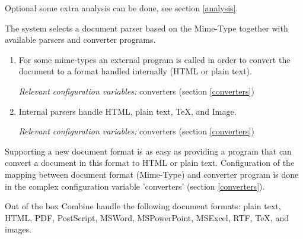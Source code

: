 Optional some extra analysis can be done, see section \ref{analysis}.

The system selects a document parser based on the Mime-Type together
with available parsers and converter programs.
\begin{enumerate}
\item For some mime-types an external program
is called in order to convert the document to a format handled internally (HTML or plain text).

{\em Relevant configuration variables:} converters (section \ref{converters})

\item Internal parsers handle HTML, plain text, TeX, and Image.

{\em Relevant configuration variables:} converters (section \ref{converters})

\end{enumerate}

Supporting a new document format is as easy as providing a program
that can convert a document in this format to HTML or plain text.
Configuration of the mapping between document format (Mime-Type) and converter program is done in the complex configuration variable 'converters' (section  \ref{converters}). 

Out of the box Combine handle the following document formats: plain text, HTML,
PDF, PostScript, MSWord, MSPowerPoint, MSExcel, RTF, TeX, and images.

%

